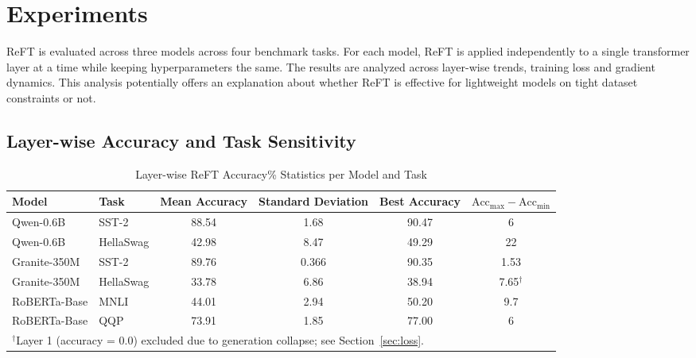 \documentclass[conference]{IEEEtran}
\begin{document}
	\section{Experiments}
	
	ReFT is evaluated across three models across four benchmark tasks. For each model, ReFT is applied independently to a single transformer layer at a time while keeping hyperparameters the same. The results are analyzed across layer-wise trends, training loss and gradient dynamics. This analysis potentially offers an explanation about whether ReFT is effective for lightweight models on tight dataset constraints or not.
	
	\subsection{Layer-wise Accuracy and Task Sensitivity}
	
	\begin{table}[t]
		\centering
		\caption{Layer-wise ReFT Accuracy\% Statistics per Model and Task}
		\label{tab:accuracy_stats}
		\begin{tabular}{llcccc}
			\hline
			\textbf{Model} & \textbf{Task} & \textbf{Mean Accuracy} & \textbf{Standard Deviation} & \textbf{Best Accuracy} & \textbf{$\text{Acc}_{\max} - \text{Acc}_{\min}$} \\
			\hline
			Qwen-0.6B    & SST-2     & 88.54 & 1.68  & 90.47 & 6 \\
			Qwen-0.6B    & HellaSwag & 42.98 & 8.47  & 49.29  & 22 \\
			Granite-350M & SST-2     & 89.76 & 0.366 & 90.35 & 1.53 \\
			Granite-350M & HellaSwag & 33.78 & 6.86  & 38.94 & 7.65$^{\dagger}$ \\
			RoBERTa-Base & MNLI      & 44.01 & 2.94  & 50.20 & 9.7 \\
			RoBERTa-Base & QQP       & 73.91 & 1.85  & 77.00 & 6 \\
			\hline
			\multicolumn{6}{l}{$^{\dagger}$Layer 1 (accuracy = 0.0) excluded due to generation collapse; see Section~\ref{sec:loss}.} \\
		\end{tabular}
	\end{table}
	
\end{document}
